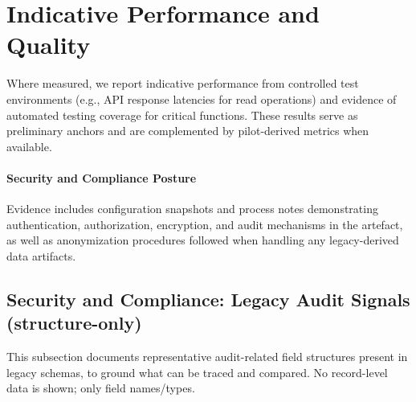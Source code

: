 \section{Indicative Performance and Quality}
Where measured, we report indicative performance from controlled test environments (e.g., API response latencies for read operations) and evidence of automated testing coverage for critical functions. These results serve as preliminary anchors and are complemented by pilot-derived metrics when available.

\paragraph{Security and Compliance Posture}
Evidence includes configuration snapshots and process notes demonstrating authentication, authorization, encryption, and audit mechanisms in the artefact, as well as anonymization procedures followed when handling any legacy-derived data artifacts.

\subsection*{Security and Compliance: Legacy Audit Signals (structure-only)}
This subsection documents representative audit-related field structures present in legacy schemas, to ground what can be traced and compared. No record-level data is shown; only field names/types.

